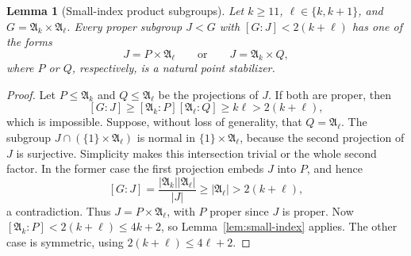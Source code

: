 \documentclass[11pt,a4paper]{article}
\newtheorem{lemma}[theorem]{Lemma}
\theoremstyle{definition}
\theoremstyle{remark}
\newcommand{\Alt}{\mathfrak A}
\begin{document}
\begin{lemma}[Small-index product subgroups]\label{lem:product-index}
Let $k\ge11$, $\ell\in\{k,k+1\}$, and $G=\Alt_k\times\Alt_\ell$.
Every proper subgroup $J<G$ with $[G:J]<2(k+\ell)$ has one of the forms
\[
 J=P\times\Alt_\ell
 \qquad\text{or}\qquad
 J=\Alt_k\times Q,
\]
where $P$ or $Q$, respectively, is a natural point stabilizer.
\end{lemma}
\begin{proof}
Let $P\le\Alt_k$ and $Q\le\Alt_\ell$ be the projections of $J$.
If both are proper, then
\[
 [G:J]\ge[\Alt_k:P][\Alt_\ell:Q]\ge k\ell>2(k+\ell),
\]
which is impossible. Suppose, without loss of generality, that
$Q=\Alt_\ell$. The subgroup
$J\cap(\{1\}\times\Alt_\ell)$ is normal in $\{1\}\times\Alt_\ell$,
because the second projection of $J$ is surjective. Simplicity makes
this intersection trivial or the whole second factor. In the former
case the first projection embeds $J$ into $P$, and hence
\[
 [G:J]=\frac{|\Alt_k||\Alt_\ell|}{|J|}
 \ge |\Alt_\ell|>2(k+\ell),
\]
a contradiction. Thus $J=P\times\Alt_\ell$, with $P$ proper since
$J$ is proper. Now $[\Alt_k:P]<2(k+\ell)\le4k+2$, so
Lemma~\ref{lem:small-index} applies. The other case is symmetric,
using $2(k+\ell)\le4\ell+2$.
\end{proof}
\end{document}

